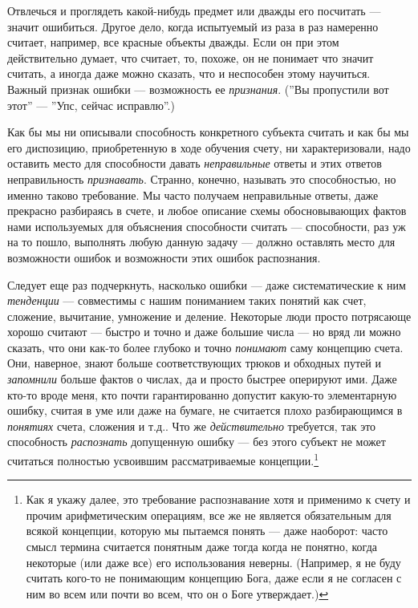 \documentclass[11pt]{book}
\begin{document}
Отвлечься и проглядеть какой-нибудь предмет или дважды его посчитать --- значит ошибиться. Другое дело, когда испытуемый из раза в раз намеренно считает, например, все красные объекты дважды. Если он при этом действительно думает, что считает, то, похоже, он не понимает что значит считать, а иногда даже можно сказать, что и неспособен этому научиться. Важный признак ошибки --- возможность ее \textit{признания}. (''Вы пропустили вот этот'' --- ''Упс, сейчас исправлю''.)

Как бы мы ни описывали способность конкретного субъекта считать и как бы мы его диспозицию, приобретенную в ходе обучения счету, ни характеризовали, надо оставить место для способности давать \textit{неправильные} ответы и этих ответов неправильность \textit{признавать}. Странно, конечно, называть это способностью, но именно таково требование. Мы часто получаем неправильные ответы, даже прекрасно разбираясь в счете, и любое описание схемы обосновывающих фактов нами используемых для объяснения способности считать --- способности, раз уж на то пошло, выполнять любую данную задачу --- должно оставлять место для возможности ошибок и возможности этих ошибок распознания.

Следует еще раз подчеркнуть, насколько ошибки --- даже систематические к ним \textit{тенденции} --- совместимы с нашим пониманием таких понятий как счет, сложение, вычитание, умножение и деление. Некоторые люди просто потрясающе хорошо считают --- быстро и точно и даже большие числа --- но вряд ли можно сказать, что они как-то более глубоко и точно \textit{понимают} саму концепцию счета. Они, наверное, знают больше соответствующих трюков и обходных путей и \textit{запомнили} больше фактов о числах, да и просто быстрее оперируют ими. Даже кто-то вроде меня, кто почти гарантированно допустит какую-то элементарную ошибку, считая в уме или даже на бумаге, не считается плохо разбирающимся в \textit{понятиях} счета, сложения и т.д.. Что же \textit{действительно} требуется, так это способность \textit{распознать} допущенную ошибку --- без этого субъект не может считаться полностью усвоившим рассматриваемые концепции.\footnote{Как я укажу далее, это требование распознавание хотя и применимо к счету и прочим арифметическим операциям, все же не является обязательным для всякой концепции, которую мы пытаемся понять --- даже наоборот: часто смысл термина считается понятным даже тогда когда не понятно, когда некоторые (или даже все) его использования неверны. (Например, я не буду считать кого-то не понимающим концепцию Бога, даже если я не согласен с ним во всем или почти во всем, что он о Боге утверждает.)}
\end{document}
